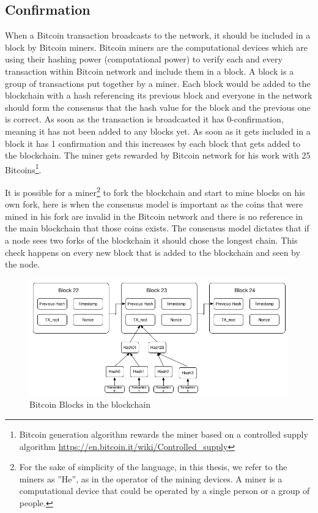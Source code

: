 \subsection{Confirmation}
When a Bitcoin transaction broadcasts to the network, it should be included in a block by Bitcoin miners. Bitcoin miners are the computational devices which are using their hashing power (computational power) to verify each and every transaction within Bitcoin network and include them in a block. A block is a group of transactions put together by a miner. Each block would be added to the blockchain with a hash referencing its previous block and everyone in the network should form the consensus that the hash value for the block and the previous one is correct. As soon as the transaction is broadcasted it has 0-confirmation, meaning it has not been added to any blocks yet. As soon as it gets included in a block it has 1 confirmation and this increases by each block that gets added to the blockchain. The miner gets rewarded by Bitcoin network for his work with 25 Bitcoins\footnote{Bitcoin generation algorithm rewards the miner based on a controlled supply algorithm \url{https://en.bitcoin.it/wiki/Controlled_supply}}.

It is possible for a miner\footnote{For the sake of simplicity of the language, in this thesis, we refer to the miners as ''He'', as in the operator of the mining devices. A miner is a computational device that could be operated by a single person or a group of people.} to fork the blockchain and start to mine blocks on his own fork, here is when the consensus model is important as the coins that were mined in his fork are invalid in the Bitcoin network and there is no reference in the main blockchain that those coins exists. The consensus model dictates that if a node sees two forks of the blockchain it should chose the longest chain. This check happens on every new block that is added to the blockchain and seen by the node.

\begin{figure}
\centering
\includegraphics[width=\linewidth]{fig/Bitcoinblocks.png}
  \caption{Bitcoin Blocks in the blockchain ~\cite{Nak08}}
\label{fig:Bitcoinblocks}
\end{figure}

